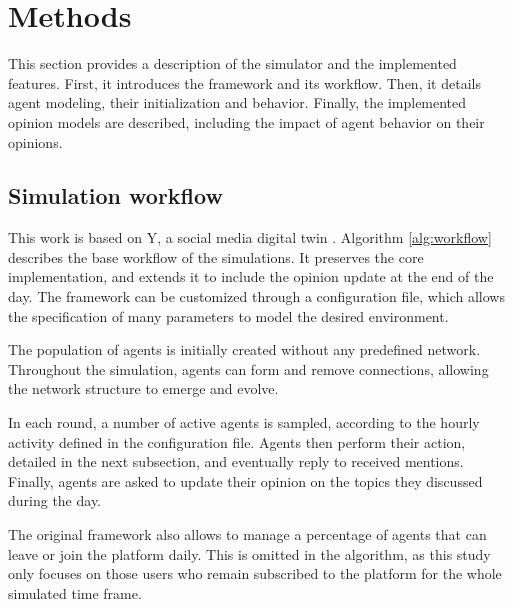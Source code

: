 \section{Methods}
\label{sec:methods}

This section provides a description of the simulator and the implemented features.
First, it introduces the framework and its workflow.
Then, it details agent modeling, their initialization and behavior.
Finally, the implemented opinion models are described, including the impact of agent behavior on their opinions.

\subsection{Simulation workflow}
This work is based on Y, a social media digital twin \cite{rossetti2024ysocialllmpoweredsocial}.
Algorithm \ref{alg:workflow} describes the base workflow of the simulations. 
It preserves the core implementation, and extends it to include the opinion update at the end of the day.
The framework can be customized through a configuration file, which allows the specification of many parameters to model the desired environment.

The population of agents is initially created without any predefined network.
Throughout the simulation, agents can form and remove connections, allowing the network structure to emerge and evolve.

In each round, a number of active agents is sampled, according to the hourly activity defined in the configuration file.
Agents then perform their action, detailed in the next subsection, and eventually reply to received mentions.
Finally, agents are asked to update their opinion on the topics they discussed during the day.

The original framework also allows to manage a percentage of agents that can leave or join the platform daily. This is omitted in the algorithm, as this study only focuses on those users who remain subscribed to the platform for the whole simulated time frame. 

